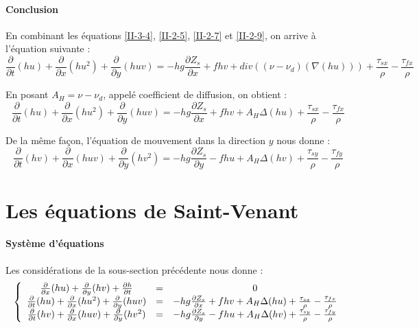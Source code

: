 \paragraph{Conclusion}
En combinant les équations \ref{II-3-4},  \ref{II-2-5}, \ref{II-2-7} et \ref{II-2-9}, on arrive à l'équation suivante :
\[\frac{\partial}{\partial t}(hu) + \frac{\partial}{\partial x} (hu^2) + \frac{\partial}{\partial y}(huv) = -hg\frac{\partial Z_s}{\partial x} + fhv + div((\nu-\nu_d)(\nabla(hu))) + \frac{\tau_{sx}}{\rho} - \frac{\tau_{fx}}{\rho}\]

En posant $A_H=\nu-\nu_d$, appelé coefficient de diffusion, on obtient :
\begin{equation} \label{II-2-10}
	\frac{\partial}{\partial t}(hu) + \frac{\partial}{\partial x} (hu^2) + \frac{\partial}{\partial y}(huv) = -hg\frac{\partial Z_s}{\partial x} + fhv + A_H\Delta(hu) + \frac{\tau_{sx}}{\rho} - \frac{\tau_{fx}}{\rho}
\end{equation}

De la même façon, l'équation de mouvement dans la direction $y$ nous donne :
\begin{equation} \label{II-2-11}
	\frac{\partial}{\partial t}(hv) + \frac{\partial}{\partial x} (huv) + \frac{\partial}{\partial y}(hv^2) = -hg\frac{\partial Z_s}{\partial y} - fhu + A_H\Delta(hv) + \frac{\tau_{sy}}{\rho} - \frac{\tau_{fy}}{\rho}
\end{equation}

\section{Les équations de Saint-Venant}
\paragraph{Système d'équations}
Les considérations de la sous-section précédente nous donne :
\[\left\{ \begin{array}{c c c}
	\frac{\partial}{\partial x} (hu) + \frac{\partial}{\partial y} (hv) + \frac{\partial h}{\partial t} &=& 0 \\
      \frac{\partial}{\partial t}(hu) + \frac{\partial}{\partial x} (hu^2) + \frac{\partial}{\partial y}(huv) &=& -hg\frac{\partial Z_s}{\partial x} + fhv + A_H\Delta(hu) + \frac{\tau_{sx}}{\rho} - \frac{\tau_{fx}}{\rho}\\
	     \frac{\partial}{\partial t}(hv) + \frac{\partial}{\partial x} (huv) + \frac{\partial}{\partial y}(hv^2) &=& -hg\frac{\partial Z_s}{\partial y} - fhu + A_H\Delta(hv) + \frac{\tau_{sy}}{\rho} - \frac{\tau_{fy}}{\rho}
\end{array}\right.\]

